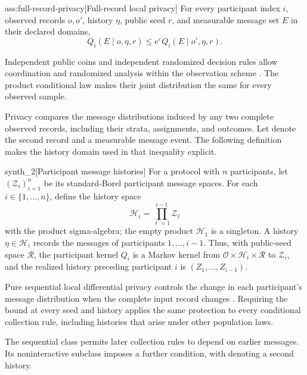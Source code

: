 \documentclass[11pt]{article}
\begin{document}
\begin{assumptionv}{ass:full-record-privacy}[Full-record local privacy]
For every participant index \(i\), observed records \(o,o'\), history \(\eta\), public seed \(r\), and measurable message set \(E\) in their declared domains,
\[
Q_i(E\mid o,\eta,r)\le e^\varepsilon Q_i(E\mid o',\eta,r).
\]
\end{assumptionv}

Independent public coins and independent randomized decision rules allow coordination and randomized analysis within the observation scheme \citep{AcharyaCanonneFreitagTyagi2019TestWithoutTrust}. The product conditional law makes their joint distribution the same for every observed sample.

Privacy compares the message distributions induced by any two complete observed records, including their strata, assignments, and outcomes. Let  denote the second record and  a measurable message event. The following definition makes the history domain used in that inequality explicit.

\begin{definitionv}{synth_2}[Participant message histories]
For a protocol with \(n\) participants, let \((\mathcal Z_i)_{i=1}^n\) be its standard-Borel participant message spaces. For each \(i\in\{1,\ldots,n\}\), define the history space
\[
\mathcal H_i=\prod_{\ell=1}^{i-1}\mathcal Z_\ell
\]
with the product sigma-algebra; the empty product \(\mathcal H_1\) is a singleton. A history \(\eta\in\mathcal H_i\) records the messages of participants \(1,\ldots,i-1\). Thus, with public-seed space \(\mathcal R\), the participant kernel \(Q_i\) is a Markov kernel from \(\mathcal O\times\mathcal H_i\times\mathcal R\) to \(\mathcal Z_i\), and the realized history preceding participant \(i\) is \((Z_1,\ldots,Z_{i-1})\).
\end{definitionv}

Pure sequential local differential privacy controls the change in each participant's message distribution when the complete input record changes \citep{DuchiJordanWainwright2018Minimax}. Requiring the bound at every seed and history applies the same protection to every conditional collection rule, including histories that arise under other population laws.

The sequential class permits later collection rules to depend on earlier messages. Its noninteractive subclass imposes a further condition, with  denoting a second history.
\end{document}
